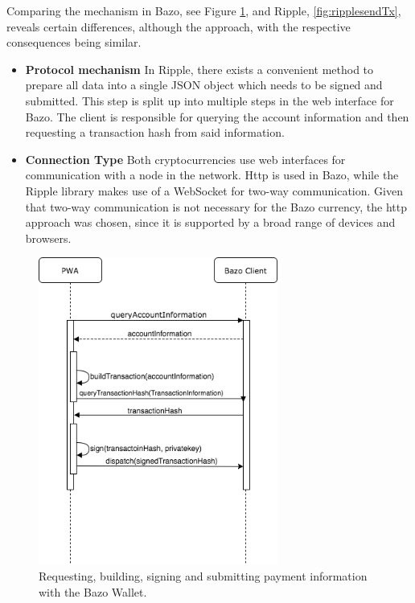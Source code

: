 Comparing the mechanism in Bazo, see Figure \ref{fig:TransactionProcess}, and Ripple, \ref{fig:ripplesendTx}, reveals certain differences, although the approach, with the respective consequences being similar.
\begin{itemize}
\item \textbf{Protocol mechanism} In Ripple, there exists a convenient method to prepare all data into a single JSON object which needs to be signed and submitted. This step is split up into multiple steps in the web interface for Bazo. The client is responsible for querying the account information and then requesting a transaction hash from said information.
\item \textbf{Connection Type} Both cryptocurrencies use web interfaces for communication with a node in the network. Http is used in Bazo, while the Ripple library makes use of a WebSocket for two-way communication. Given that two-way communication is not necessary for the Bazo currency, the http approach was chosen, since it is supported by a broad range of devices and browsers.
\end{itemize}

\begin{figure}
\centering
\includegraphics[width=0.7\textwidth]{diagrams/transactionProcess.png}
\caption{\label{fig:TransactionProcess}Requesting, building, signing and submitting payment information with the Bazo Wallet.}
\end{figure}

